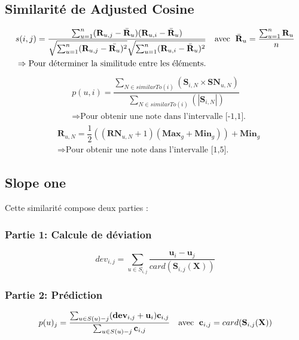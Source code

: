 \documentclass[11pt,fleqn]{book} %
\begin{document}
\subsection{Similarité de Adjusted Cosine}
\vspace{3mm}
\begin{theorem}
\begin{align*}
    & s(i,j) =\dfrac{\sum_{u=1}^n(\mathbf{R}_{u,j} - \bar{\mathbf{R}}_u)(\mathbf{R}_{u,i}- \bar{\mathbf{R}}_u)}{\sqrt{\sum_{u=1}^n(\mathbf{R}_{u,j} - \bar{\mathbf{R}_u})^2}\sqrt{\sum_{u=1}^n(\mathbf{R}_{u,i} - \bar{\mathbf{R}}_u)^2}}
   \quad{\text{avec \hspace{1mm}} \bar{\mathbf{R}}_u =\dfrac{ \sum_{u=1}^n\mathbf{R}_u}{n}}\\
   & \Rightarrow{\text{Pour déterminer la similitude entre les éléments.}}
\end{align*}
\begin{align*}
    & p(u,i) =\dfrac{ \sum_{N \in similarTo(i)}(\mathbf{S}_{i,N} \times \mathbf{SN}_{u,N})}{\sum_{N \in similarTo(i)}(|\mathbf{S}_{i,N}|)}\\
   & \Rightarrow{\text{Pour obtenir une note dans l'intervalle [-1,1].}}
\end{align*}
\begin{align*}
    & \mathbf{R}_{u,N}=\dfrac{1}{2} ((\mathbf{RN}_{u,N}+1)(\mathbf{Max}_g+\mathbf{Min}_g)) +\mathbf{Min}_g \\
   & \Rightarrow{\text{Pour obtenir une note dans l'intervalle [1,5].}}
\end{align*}
\end{theorem}
\subsection{Slope one}
Cette similarité compose deux parties :
\subsubsection{Partie 1: Calcule de déviation}
\vspace{3mm}
\begin{theorem}
$$
    dev_{i,j} = \sum_{u \in S_{i,j}}\dfrac{\mathbf{u}_{i}-\mathbf{u}_{j}}{card(\mathbf{S}_{i,j}(\mathbf{X}))}
$$
\end{theorem}
\subsubsection{Partie 2: Prédiction}
\vspace{3mm}
\begin{theorem}
$$
    p(u)_{j} =\dfrac{\sum_{u \in S(u)-{j}}(\mathbf{dev}_{i,j} + \mathbf{u}_{i})\mathbf{c}_{i,j}}{\sum_{u \in S(u)-j}\mathbf{c}_{i,j}}
   \quad{\text{avec \hspace{1mm}} \mathbf{c}_{i,j} = card(\mathbf{S}_{i,j}(\mathbf{X}))} 
$$
\end{theorem}
\end{document}

